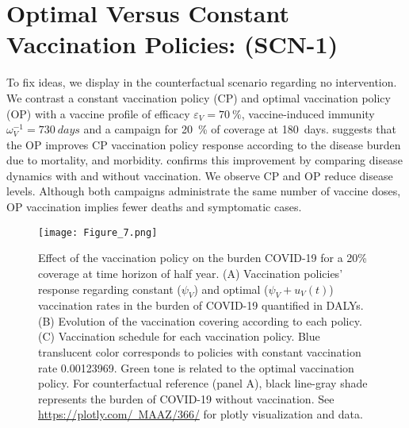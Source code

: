 \section*{Optimal Versus Constant Vaccination Policies: (SCN-1)}
        To fix ideas, we display in
    the counterfactual scenario regarding no intervention. We
    contrast a constant vaccination policy (CP) and optimal vaccination
    policy (OP) with a vaccine profile of efficacy
    $\varepsilon_V = \SI{70}{\percent}$, vaccine-induced immunity
    $\omega_V^{-1} = \SI{730}{days}$ and a campaign for \SI{20}{\percent}
    of coverage at \SI{180}{days}. 
    suggests that the OP improves CP vaccination policy response according to
    the disease burden due to mortality, and morbidity.
     confirms this improvement by
    comparing disease dynamics with and without vaccination. We observe CP and
    OP reduce disease levels. Although both campaigns administrate the same
    number of vaccine doses, OP vaccination implies fewer deaths and
    symptomatic cases.
    \begin{figure*}[tbh!]
        \centering
        \texttt{[image: Figure\_7.png]}
        \caption[Effect of the vaccination policy on the burden COVID-19]{%
        Effect of the vaccination policy on the burden COVID-19 for a 20\%
        coverage at time horizon of half year.
        (A) Vaccination policies' response regarding constant ($\psi_V$)
        and optimal ($\psi_V+u_V(t)$)  vaccination rates in the burden of
        COVID-19 quantified in DALYs. (B) Evolution of the
        vaccination covering according to each policy.
        (C) Vaccination schedule for each vaccination policy.
        Blue translucent color corresponds to policies with constant
        vaccination rate \num{0.00123969}. Green tone is related to the
        optimal vaccination policy. For counterfactual reference (panel A),
        black line-gray shade represents the burden of COVID-19 without
        vaccination.
        See \href{https://plotly.com/~MAAZ/366/}{%
                https://plotly.com/~MAAZ/366/}
        for plotly visualization and data.
        }
        \label{fig:lifelongvaccinationpolicies}
    \end{figure*}
